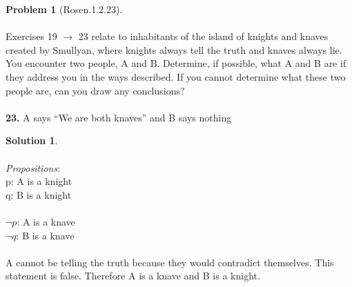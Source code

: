 \documentclass{article}
\theoremstyle{definition}
\newtheorem*{problem}{Problem}
\newtheorem*{solution}{Solution}
\begin{document}
\begin{problem}[Rosen.1.2.23]\ \\
\ \\
Exercises 19 $\rightarrow$ 23 relate to inhabitants of the island of knights
and knaves created by Smullyan, where knights always tell
the truth and knaves always lie. You encounter two people,
A and B. Determine, if possible, what A and B are if they
address you in the ways described. If you cannot determine
what these two people are, can you draw any conclusions?\ \\
\ \\
\textbf{23.} A says “We are both knaves” and B says nothing
\begin{compactenum}
\renewcommand{\theenumi}{\alph{enumi}}

\end{compactenum}
\end{problem}

\begin{solution}\ \\
\ \\
\textit{Propositions}:\ \\
p: A is a knight\ \\
q: B is a knight\ \\
\ \\
$\neg p$: A is a knave\ \\
$\neg q$: B is a knave\ \\
\ \\
\noindent
A cannot be telling the truth because they would contradict themselves. This statement is false. Therefore A is a knave and B is a knight. 


\begin{compactenum}
\renewcommand{\theenumi}{\alph{enumi}}


\end{compactenum}
\end{solution}
\end{document}
